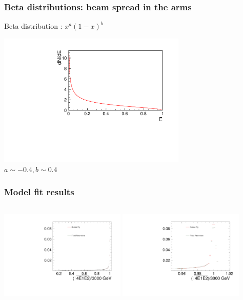 \documentclass{beamer}
\begin{document}
\begin{frame}
\frametitle{Beta distributions: beam spread in the
arms}\label{slide:betadistspreadarm} 
Beta distribution : $x^a(1-x)^b$ 
\begin{center}
\includegraphics[width=9cm]{BetaFunction_beamspreadarms.pdf}\\
$a\sim-0.4, b\sim0.4$
\end{center}
\end{frame}

\begin{frame}
\frametitle{Model fit results}\label{slide:fitresultslin}
\begin{columns}[c]
\column{6cm}
\includegraphics[width=6cm]{FullSpectrumFCAL_notlog.pdf}
\column{6cm}
\includegraphics[width=6cm]{FullSpectrumFCAL_zoom_notlog.pdf}
\end{columns}
\end{frame}
\end{document}
